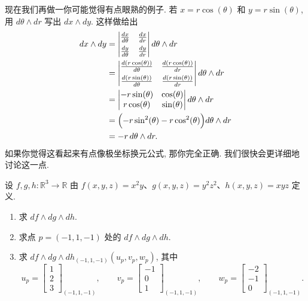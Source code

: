 现在我们再做一你可能觉得有点眼熟的例子. 若 $x=r\cos(\theta)$ 和 $y=r\sin(\theta)$, 用 $d\theta\wedge dr$ 写出 $dx\wedge dy$. 这样做给出
\begin{align*}
dx\wedge dy&=\begin{vmatrix}\frac{dx}{d\theta}&\frac{dx}{dr}\\[4pt]\frac{dy}{d\theta}&\frac{dy}{dr}\end{vmatrix}d\theta\wedge dr\\
&=\begin{vmatrix}\frac{d(r\cos(\theta))}{d\theta}&\frac{d(r\cos(\theta))}{dr}\\[4pt]\frac{d(r\sin(\theta))}{d\theta}&\frac{d(r\sin(\theta))}{dr}\end{vmatrix}d\theta\wedge dr\\
&=\begin{vmatrix}-r\sin(\theta)&\cos(\theta)\\r\cos(\theta)&\sin(\theta)\end{vmatrix}d\theta\wedge dr\\
&=\Bigl(-r\sin^2(\theta)-r\cos^2(\theta)\Bigr)d\theta\wedge dr\\
&=-r\,d\theta\wedge dr.
\end{align*}
如果你觉得这看起来有点像极坐标换元公式, 那你完全正确. 我们很快会更详细地讨论这一点.

\begin{question}\label{q:4-12}
设 $f,g,h:\mathbb{R}^3\to\mathbb{R}$ 由 $f(x,y,z)=x^2y$、$g(x,y,z)=y^2z^2$、$h(x,y,z)=xyz$ 定义.
\begin{enumerate}
  \item[(a)] 求 $df\wedge dg\wedge dh$.
  \item[(b)] 求点 $p=(-1,1,-1)$ 处的 $df\wedge dg\wedge dh$.
  \item[(c)] 求 $df\wedge dg\wedge dh_{(-1,1,-1)}(u_p,v_p,w_p)$, 其中
  \[
  u_p=\begin{bmatrix}1\\2\\3\end{bmatrix}_{\!(-1,1,-1)},\qquad
  v_p=\begin{bmatrix}-1\\0\\1\end{bmatrix}_{\!(-1,1,-1)},\qquad
  w_p=\begin{bmatrix}-2\\-1\\0\end{bmatrix}_{\!(-1,1,-1)}.
  \]
\end{enumerate}
\end{question}

